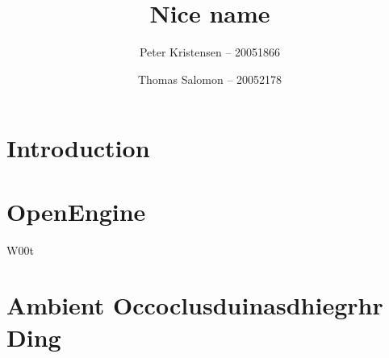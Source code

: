 \documentclass{article}
\title{Nice name}
\author{
  Peter Kristensen -- 20051866 \and
  Thomas Salomon -- 20052178
}
\begin{document}
\maketitle

\section {Introduction}

\section {OpenEngine}

W00t

\section{Ambient Occoclusduinasdhiegrhr Ding}


\end{document}
